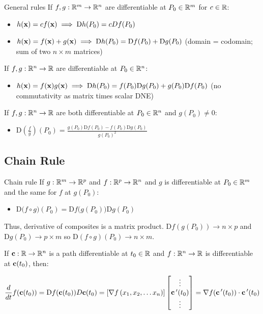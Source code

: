 \begin{mybox}{General rules}
If $f,g:\mathbb{R}^m\to \mathbb{R}^n$ are differentiable at $P_0\in \mathbb{R}^m$ for $c\in \mathbb{R}$:
\begin{itemize}
    \item $h(\textbf{x})=cf(\textbf{x})\implies \mathrm{D}h(P_0)=cDf(P_0)$
    \item $h(\textbf{x})=f(\textbf{x})+g(\textbf{x})\implies \mathrm{D}h(P_0)=\mathrm{D}f(P_0)+\mathrm{D}g(P_0)$ (domain = codomain; sum of two $n\times m$ matrices)
\end{itemize}

If $f,g:\mathbb{R}^n\to \mathbb{R}$ are differentiable at $P_0\in \mathbb{R}^n$:
\begin{itemize}
    \item $h(\textbf{x})=f(\textbf{x})g(\textbf{x})\implies \mathrm{D}h(P_0)=f(P_0)\mathrm{D}g(P_0)+g(P_0)\mathrm{D}f(P_0)$ (no commutativity as matrix times scalar DNE)
\end{itemize}

If $f,g:\mathbb{R}^n\to \mathbb{R}$ are both differentiable at $P_0\in \mathbb{R}^n$ and $g(P_0)\neq 0$:
\begin{itemize}
    \item $\mathrm{D}\left(\frac{f}{g}\right)(P_0)=\frac{g(P_0)\mathrm{D}f(P_0)-f(P_0)\mathrm{D}g(P_0)}{g(P_0)^2}$
\end{itemize}
\end{mybox}

\subsection{Chain Rule}

\begin{mybox}{Chain rule}
If $g:\mathbb{R}^m\to \mathbb{R}^p$ and $f:\mathbb{R}^p\to \mathbb{R}^n$ and $g$ is differentiable at $P_0\in \mathbb{R}^m$ and the same for $f$ at $g(P_0)$:
\begin{itemize}
    \item $\mathrm{D}\Big(f\circ g\Big)(P_0)=\mathrm{D}f\big(g(P_0)\big)\mathrm{D}g(P_0)$
\end{itemize}
\end{mybox}

Thus, derivative of composites is a matrix product. $\mathrm{D}f(g(P_0))\to n\times p$ and $\mathrm{D}g(P_0)\to p\times m$
so $\mathrm{D}(f\circ g)(P_0)\to n\times m$.

If $\textbf{c}:\mathbb{R}\to \mathbb{R}^n$ is a path differentiable at $t_0\in \mathbb{R}$ and $f:\mathbb{R}^n\to \mathbb{R}$ is differentiable at $\textbf{c}(t_0)$, then:

\[\frac{d}{dt}f(\textbf{c}(t_0))=\mathrm{D}f(\textbf{c}(t_0))D\textbf{c}(t_0)=\left[ \nabla f\left( x_{1},x_{2},\ldots x_{n}\right) \right]\begin{bmatrix} \vdots \\ \textbf{c}\,'(t_0) \\ \vdots \end{bmatrix}=\nabla f(\textbf{c}\,'(t_0))\cdot \textbf{c}\,'(t_0)\]

